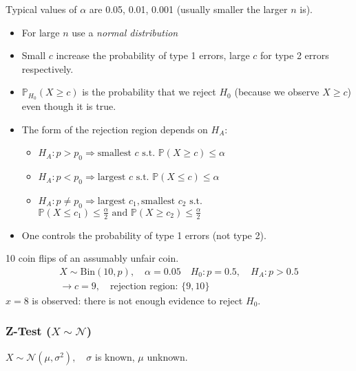 Typical values of $\alpha$ are 0.05, 0.01, 0.001 (usually smaller the larger $n$ is).

\newpar{}
\begin{itemize}
    \item For large $n$ use a \textit{normal distribution}
    \item Small $c$ increase the probability of type 1 errors, large $c$ for type 2 errors respectively.
    \item $\mathbb{P}_{H_0}(X\geq c)$ is the probability that we reject $H_0$ (because we observe $X\geq c$) even though it is true.
    \item The form of the rejection region depends on $H_A$:
          \begin{itemize}
              \item $H_A: p>p_0 \Rightarrow \text{smallest }c\text{ s.t. } \mathbb{P}(X\geq c)\leq \alpha$
              \item $H_A: p<p_0 \Rightarrow \text{largest }c\text{ s.t. } \mathbb{P}(X\leq c)\leq \alpha$
              \item $H_A: p\neq p_0 \Rightarrow \text{largest } c_1, \text{smallest }c_2 \text{ s.t.}$\newline
                    $ \mathbb{P}(X\leq c_1)\leq \frac{\alpha}{2} \text{ and }\mathbb{P}(X\geq c_2)\leq \frac{\alpha}{2}$
          \end{itemize}
    \item One controls the probability of type 1 errors (not type 2).
\end{itemize}

\begin{examplesection}
    10 coin flips of an assumably unfair coin.
    \noindent\begin{gather*}
        X\sim \mathrm{Bin}(10,p),\quad \alpha = 0.05\quad H_0:p=0.5,\quad H_A: p>0.5\\
        \to c=9,\quad \text{rejection region: }\{9,10\}
    \end{gather*}
    $x=8$ is observed: there is not enough evidence to reject $H_0$.
\end{examplesection}

\subsubsection[Z-Test]{Z-Test ($X\sim\mathcal{N}$)}
$X\sim\mathcal{N}(\mu,\sigma^2), \quad \sigma$ is known, $\mu$ unknown.

